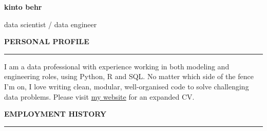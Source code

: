 \documentclass[10pt]{article}
\begin{document}
\lsstyle

\pagecolor{skyblue}

\newcommand{\stub}{\textcolor{skyblue}{\rule{3cm}{3mm}}}

\begin{huge}\begin{center}{\bf kinto behr}\end{center}\end{huge}
\begin{Large}\begin{center}{data scientist / data engineer}\end{center}\end{Large}
\vspace{1cm}

\begin{large}
{\bf PERSONAL PROFILE} \\
\textcolor{gray}{\rule{2cm}{2mm}}
\end{large}
\vspace{5pt}

\begin{small}
I am a data professional with experience working in both modeling and engineering roles, using Python, R and SQL. 
No matter which side of the fence I'm on, I love writing clean, modular, well-organised code to solve challenging data problems.
Please visit \href{https://kinto-b.github.io/}{my website} for an expanded CV.

\end{small}

\vspace{1cm}
\begin{large}
{\bf EMPLOYMENT HISTORY} \\
\textcolor{gray}{\rule{2cm}{2mm}}
\end{large}
\vspace{5pt}
\end{document}
